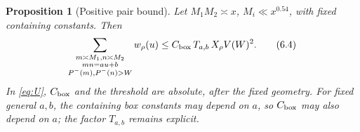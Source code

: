 \documentclass[11pt]{article}
\newtheorem{proposition}[theorem]{Proposition}
\theoremstyle{definition}
\theoremstyle{definition}
\begin{document}
\begin{proposition}[Positive pair bound]\label{prop:pair}
Let \(M_1M_2\asymp x\), \(M_i\ll x^{0.54}\), with fixed containing constants. Then
\begin{equation}
\sum_{\substack{m\asymp M_1,n\asymp M_2\\mn=au+b\\
                         P^-(m),P^-(n)>W}}
 w_\rho(u)\le C_{\rm box}\,T_{a,b}\,X_\rho V(W)^2.       \tag{6.4}\label{eq:6-4}
\end{equation}
In \eqref{eq:U}, \(C_{\rm box}\) and the threshold are absolute, after the fixed geometry. For fixed general \(a,b\), the containing box constants may depend on \(a\), so \(C_{\rm box}\) may also depend on \(a\); the factor \(T_{a,b}\) remains explicit.

\end{proposition}
\end{document}

